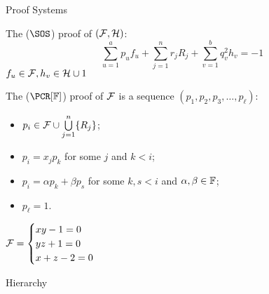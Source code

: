 \begin{frame}{Proof Systems}

    The  ($\SOS$) proof of $(\Fs, \Hs)$:
    $$
        \sum_{u = 1}^{a} p_u f_u + \sum_{j = 1}^{n} r_j R_j + \sum_{v = 1}^{b} q_v^2 h_v = -1
    $$
    $f_u \in \Fs, h_v \in \Hs \cup {1}$

    \pause
    \vspace{0.4cm}

    The  ($\PCR[\field]$) proof of $\Fs$ is a sequence
    $(p_1, p_2, p_3, \dots, p_{\ell})$:
    \pause
    \begin{itemize}
        \item $p_i \in \Fs \cup \bigcup\limits_{j = 1}^{n} \{R_j\}$;
        \pause
        \item $p_i = x_j p_k$ for some $j$ and $k < i$;
        \pause    
        \item $p_i = \alpha p_k + \beta p_s$ for some $k, s < i$ and $\alpha, \beta \in \field$;
        \pause
            \item $p_{\ell} = 1$.
    \end{itemize}

    \pause
    \vspace{-0.2cm}
    \begin{minipage}{0.4\linewidth}
        $\Fs =
        \begin{cases}
            xy - 1 = 0 \\
            yz + 1 = 0 \\
            x + z - 2 = 0
        \end{cases}$
    \end{minipage}
    \pause
    \begin{minipage}{0.58\linewidth}
        \begin{prooftree}
        \end{prooftree}
    \end{minipage}



\end{frame}


\begin{frame}{Hierarchy}

    
    
\end{frame}




